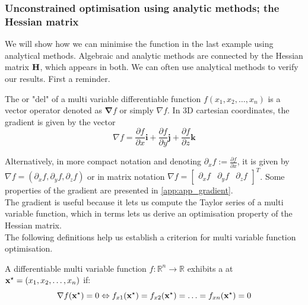 \documentclass[a4paper]{article}
\numberwithin{equation}{section} %
\newcounter{example}
\newcommand{\setR}{\mathbb{R}} %
\newcommand{\setRn}{\mathbb{R}^n} %
\newcommand{\B}[1]{\textbf{\textup{#1}}} %
\newcommand{\emphasis}[1]{\textls{#1}}
\begin{document}
\subsubsection{Unconstrained optimisation using analytic methods; the Hessian matrix}
We will show how we can minimise the function in the last example using analytical methods. Algebraic and analytic methods are connected by the Hessian matrix $\B{H}$, which appears in both. We can often use analytical methods to verify our results. First a reminder.

\begin{shaded*}
\begin{definition}
The \emphasis{gradient} or "del" of a multi variable differentiable function $f(x_1,x_2,\ldots,x_n)$ is a vector operator denoted as $\boldsymbol{\nabla }f$ or simply $\nabla f$. In 3D cartesian coordinates, the gradient is given by the vector
\begin{equation}
\nabla f = \frac{\partial f}{\partial x}\mathbf{i}+\frac{\partial f}{\partial y}\mathbf{j}+\frac{\partial f}{\partial z}\mathbf{k}
\end{equation}

\end{definition}
\end{shaded*}
Alternatively, in more compact notation and denoting $\partial _x f:=\tfrac{\partial f}{\partial x}$, it is given by $\nabla f=\left(\partial_x f,\partial_y f,\partial_z f\right)$ or in matrix notation $\nabla f=\begin{bmatrix} \partial_x f & \partial_y f & \partial_z f\end{bmatrix}^T$. Some properties of the gradient are presented in \ref{app:app_gradient}.\\
The gradient is useful because it lets us compute the Taylor series of a multi variable function, which in terms lets us derive an optimisation property of the Hessian matrix.\\
The following definitions help us establish a criterion for multi variable function optimisation.
\begin{shaded*}
\begin{definition}
A differentiable multi variable function $f:\setRn \rightarrow \setR$ exhibits a \emphasis{critical point} at $\B{x}^{\star} = (x_1,x_2,\ldots,x_n)$ if:
\begin{equation}
\nabla f(\B{x}^{\star}) = 0 \Leftrightarrow f_{x1}(\B{x}^{\star})=f_{x2}(\B{x}^{\star})=\ldots=f_{xn}(\B{x}^{\star})=0
\end{equation}
\end{definition}
\end{shaded*}
\end{document}
